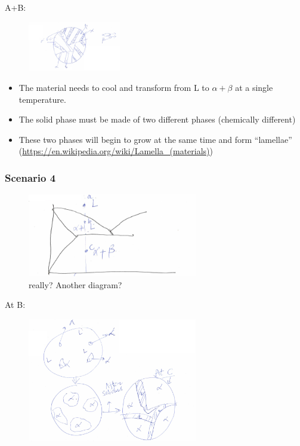 \documentclass{article}
\begin{document}
A+B: 
\begin{figure}[h!]
	\centering
	\includegraphics[width=0.36\textwidth]{assets/ae08853c.png}

\end{figure}

\begin{itemize}
    \item The material needs to cool and transform from L to $\alpha+\beta$ at a single temperature.
    \item The solid phase must be made of two different phases (chemically different)
    \item These two phases will begin to grow at the same time and form ``lamellae''\\ (\url{https://en.wikipedia.org/wiki/Lamella_(materials)})
\end{itemize}


\subsubsection{Scenario 4}

\begin{figure}[H]
	\centering
	\includegraphics[width=0.66\textwidth]{assets/667f21c8.png}
    \caption{really? Another diagram?}
    \label{fig:my_label}
\end{figure}

At B: 
\begin{figure}[h!]
	\centering
	\includegraphics[width=0.66\textwidth]{assets/9f0f1e02.png}
\end{figure}
\end{document}
